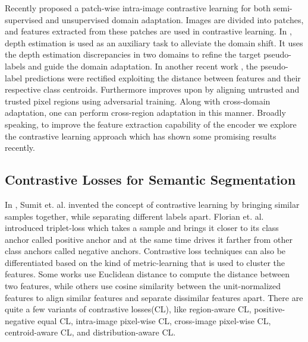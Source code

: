 \documentclass{article}
\begin{document}
Recently \cite{liu2021domain} proposed a patch-wise intra-image contrastive learning for both semi-supervised and unsupervised domain adaptation. Images are divided into patches, and features extracted from these patches are used in contrastive learning. In \cite{wang2021domain}, depth estimation is used as an auxiliary task to alleviate the domain shift. It uses the depth estimation discrepancies in two domains to refine the target pseudo-labels and guide the domain adaptation. In another recent work \cite{zhang2021prototypical}, the pseudo-label predictions were rectified exploiting the distance between features and their respective class centroids. Furthermore \cite{wang2021cross} improves upon \cite{zhang2021prototypical} by aligning untrusted and trusted pixel regions using adversarial training. Along with cross-domain adaptation, one can perform cross-region adaptation in this manner. Broadly speaking, to improve the feature extraction capability of the encoder we explore the contrastive learning approach which has shown some promising results recently.

\subsection{Contrastive Losses for Semantic Segmentation}
 In \cite{chopra2005learning}, Sumit et. al. invented the concept of
contrastive learning by bringing similar samples together, while separating different labels apart. Florian et. al. \cite{schroff2015facenet} introduced triplet-loss which takes a sample and brings it closer to its class anchor called positive anchor and at the same time drives it farther from other class anchors called negative anchors. Contrastive loss techniques can also be differentiated based on the kind of metric-learning that is used to cluster the features.
Some works \cite{chopra2005learning, schroff2015facenet} use Euclidean distance to compute the distance between two features, while others
\cite{zhao2021contrastive, wang2021cross} use cosine similarity between the unit-normalized features to align similar features and separate
dissimilar features apart. There are quite a few variants of contrastive losses(CL), like region-aware CL\cite{hu2021region}, positive-negative equal CL\cite{wang2022positive}, intra-image pixel-wise CL\cite{zhong2021pixel}, cross-image pixel-wise CL\cite{wang2021cross}, centroid-aware CL, and distribution-aware CL\cite{xie2022sepico}.
\end{document}
